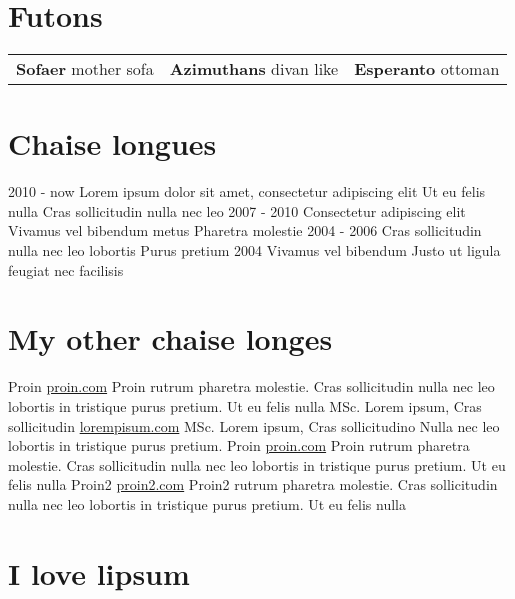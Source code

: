 \documentclass[]{viccuad-cv}
\begin{document}
\section{Futons}
    \begin{tabularx}{\linewidth}{XXr}
        \textbf{Sofaer} mother sofa & \textbf{Azimuthans} divan like & \textbf{Esperanto} ottoman \tabularnewline
    \end{tabularx}
 

\section{Chaise longues}
    \begin{entrylistdated}
      \entrydated
        {2010 - now}
        {Lorem ipsum dolor sit amet, consectetur adipiscing elit}
        {Ut eu felis nulla}
        {Cras sollicitudin nulla nec leo}
      \entrydated
        {2007 - 2010}
        {Consectetur adipiscing elit}
        {Vivamus vel bibendum metus}
        {Pharetra molestie}
      \entrydated
        {2004 - 2006}
        {Cras sollicitudin nulla nec leo lobortis}
        {}
        {Purus pretium} 
      \entrydated
        {2004}
        {Vivamus vel bibendum}
        {Justo ut ligula feugiat nec facilisis}
        {}
    \end{entrylistdated}

\section{My other chaise longes}
    \begin{entrylist}
      \entry
        {Proin}
        {\href{https://proin.com}{proin.com}}
        {Proin rutrum pharetra molestie. Cras sollicitudin nulla nec leo lobortis in tristique purus pretium. Ut eu felis nulla}
      \entry
        {MSc. Lorem ipsum, Cras sollicitudin}
        {\href{http://loremipsum.com}{lorempisum.com}}
        {}
      \entry
        {MSc. Lorem ipsum, Cras sollicitudino}
        {}
        {Nulla nec leo lobortis in tristique purus pretium.}
      \entry
        {Proin}
        {\href{https://proin.com}{proin.com}}
        {Proin rutrum pharetra molestie. Cras sollicitudin nulla nec leo lobortis in tristique purus pretium. Ut eu felis nulla}
      \entry
        {Proin2}
        {\href{https://proin2.com}{proin2.com}}
        {Proin2 rutrum pharetra molestie. Cras sollicitudin nulla nec leo lobortis in tristique purus pretium. Ut eu felis nulla}
    \end{entrylist}







\framebreak

\section{I love lipsum}
\end{document}

